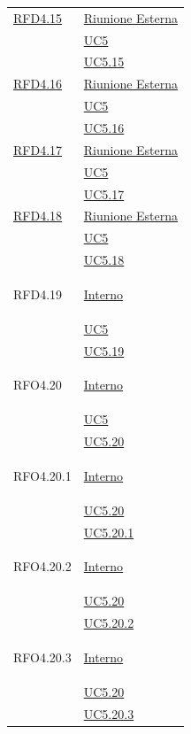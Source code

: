 \begin{longtable}{|>{\centering}m{5cm}|m{5cm}<{\centering}|}
\hyperlink{RFD4.15}{RFD4.15} & \hyperlink{Riunione Esterna}{Riunione Esterna}\\
& \hyperref[UC5]{UC5}\\
& \hyperref[UC5.15]{UC5.15}\\ \hline

\hyperlink{RFD4.16}{RFD4.16} & \hyperlink{Riunione Esterna}{Riunione Esterna}\\
& \hyperref[UC5]{UC5}\\
& \hyperref[UC5.16]{UC5.16}\\ \hline

\hyperlink{RFD4.17}{RFD4.17} & \hyperlink{Riunione Esterna}{Riunione Esterna}\\
& \hyperref[UC5]{UC5}\\
& \hyperref[UC5.17]{UC5.17}\\ \hline

\hyperlink{RFD4.18}{RFD4.18} & \hyperlink{Riunione Esterna}{Riunione Esterna}\\
& \hyperref[UC5]{UC5}\\
& \hyperref[UC5.18]{UC5.18}\\ \hline

\hypertarget{RFD4.19}{RFD4.19} & \hyperlink{Interno}{Interno}\\
&\hyperref[UC5]{UC5}\\
&\hyperref[UC5.19]{UC5.19}\\ \hline

\hypertarget{RFO4.20}{RFO4.20} & \hyperlink{Interno}{Interno}\\
&\hyperref[UC5]{UC5}\\
&\hyperref[UC5.20]{UC5.20}\\ \hline

\hypertarget{RFO4.20.1}{RFO4.20.1} & \hyperlink{Interno}{Interno}\\
&\hyperref[UC5.20]{UC5.20}\\
&\hyperref[UC5.20.1]{UC5.20.1}\\ \hline

\hypertarget{RFO4.20.2}{RFO4.20.2} & \hyperlink{Interno}{Interno}\\
&\hyperref[UC5.20]{UC5.20}\\
&\hyperref[UC5.20.2]{UC5.20.2}\\ \hline

\hypertarget{RFO4.20.3}{RFO4.20.3} & \hyperlink{Interno}{Interno}\\
&\hyperref[UC5.20]{UC5.20}\\
&\hyperref[UC5.20.3]{UC5.20.3}\\ \hline


\end{longtable}
